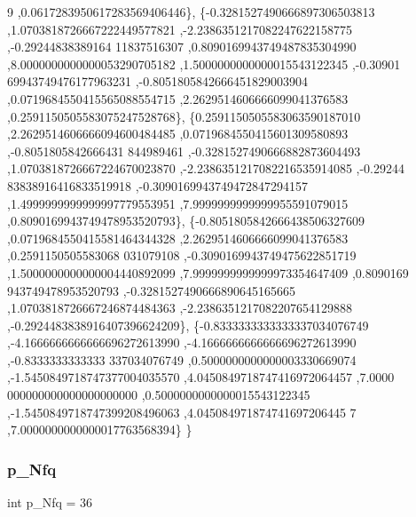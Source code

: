 \begin{DoxyCode}
      9 ,0.0617283950617283569406446\},
\{-0.3281527490666897306503813 ,1.0703818726667222449577821 ,-2.2386351217082247622158775 ,-0.29244838389164
      11837516307 ,0.8090169943749487835304990 ,8.0000000000000053290705182 ,1.5000000000000015543122345 ,-0.30901
      69943749476177963231 ,-0.8051805842666451829003904 ,0.0719684550415565088554715 ,2.2629514606666099041376583
       ,0.2591150505583075247528768\},
\{0.2591150505583063590187010 ,2.2629514606666094600484485 ,0.0719684550415601309580893 ,-0.8051805842666431
      844989461 ,-0.3281527490666882873604493 ,1.0703818726667224670023870 ,-2.2386351217082216535914085 ,-0.29244
      83838916416833519918 ,-0.3090169943749472847294157 ,1.4999999999999997779553951 ,7.9999999999999955591079015
       ,0.8090169943749478953520793\},
\{-0.8051805842666438506327609 ,0.0719684550415581464344328 ,2.2629514606666099041376583 ,0.2591150505583068
      031079108 ,-0.3090169943749475622851719 ,1.5000000000000004440892099 ,7.9999999999999973354647409 ,0.8090169
      943749478953520793 ,-0.3281527490666890645165665 ,1.0703818726667246874484363 ,-2.2386351217082207654129888 
      ,-0.2924483838916407396624209\},
\{-0.8333333333333337034076749 ,-4.1666666666666696272613990 ,-4.1666666666666696272613990 ,-0.8333333333333
      337034076749 ,0.5000000000000003330669074 ,-1.5450849718747377004035570 ,4.0450849718747416972064457 ,7.0000
      000000000000000000000 ,0.5000000000000015543122345 ,-1.5450849718747399208496063 ,4.045084971874741697206445
      7 ,7.0000000000000017763568394\}
\}
\end{DoxyCode}
\mbox{\label{a00993_aa030b0a9fe619a48647119bacea600e0}} 
\subsubsection{\texorpdfstring{p\+\_\+\+Nfq}{p\_Nfq}}
{\footnotesize\ttfamily int p\+\_\+\+Nfq = 36}

\mbox{\label{a00993_a207fd9268dfef5bf1505928a4f4c774a}} 
